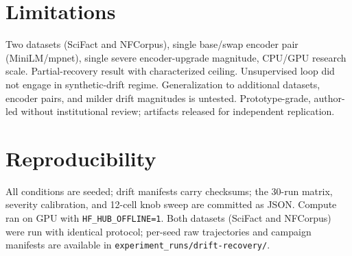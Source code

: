 \documentclass[12pt]{article}
\begin{document}
\section{Limitations}
\label{sec:limitations}

Two datasets (SciFact and NFCorpus), single base/swap encoder pair (MiniLM/mpnet), single severe encoder-upgrade magnitude, CPU/GPU research scale. Partial-recovery result with characterized ceiling. Unsupervised loop did not engage in synthetic-drift regime. Generalization to additional datasets, encoder pairs, and milder drift magnitudes is untested. Prototype-grade, author-led without institutional review; artifacts released for independent replication.

\section{Reproducibility}
\label{sec:reproducibility}

All conditions are seeded; drift manifests carry checksums; the 30-run matrix, severity calibration, and 12-cell knob sweep are committed as JSON. Compute ran on GPU with \texttt{HF\_HUB\_OFFLINE=1}. Both datasets (SciFact and NFCorpus) were run with identical protocol; per-seed raw trajectories and campaign manifests are available in \texttt{experiment\_runs/drift-recovery/}.



\end{document}
